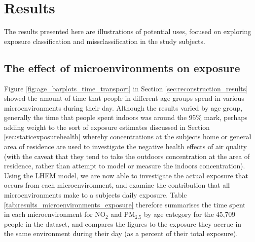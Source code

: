 \newpage

\section{Results}
\label{sec:2results}

The results presented here are illustrations of potential uses, focused on exploring exposure classification and missclassification in the study subjects.

\subsection{The effect of microenvironments on exposure}
\label{subsec:time_exposure_microenvironments}

Figure \ref{fig:age_barplots_time_transport} in Section \ref{sec:reconstruction_results} showed the amount of time that people in different age groups spend in various microenvironments during their day. Although the results varied by age group, generally the time that people spent indoors was around the 95\% mark, perhaps adding weight to the sort of exposure estimates discussed in Section \ref{sec:staticexposurehealth} whereby concentrations at the subjects home or general area of residence are used to investigate the negative health effects of air quality (with the caveat that they tend to take the outdoors concentration at the area of residence, rather than attempt to model or measure the indoors concentration). Using the LHEM model, we are now able to investigate the actual exposure that occurs from each microenvironment, and examine the contribution that all microenvironments make to a subjects daily exposure. Table \ref{tab:results_microenvironments_exposure} therefore summarises the time spent in each microenvironment for NO$_{2}$ and PM$_{2.5}$ by age category for the 45,709 people in the dataset, and compares the figures to the exposure they accrue in the same environment during their day (as a percent of their total exposure).

